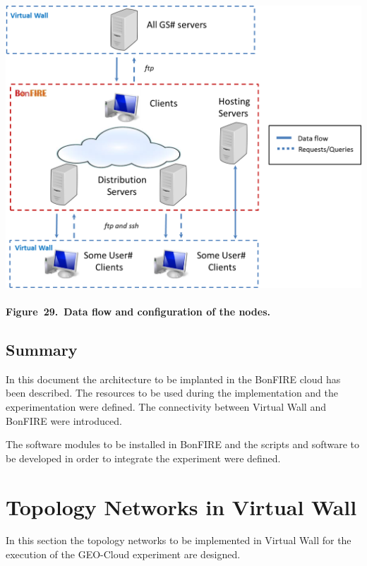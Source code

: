 \documentclass[a4paper]{article}
\begin{document}
{\centering 
\includegraphics[width=5.38496in,height=4.27496in]{out-img37.png} \par}

{\centering\bfseries
\label{bkm:Ref378755152}Figure\ 29.\ Data flow and configuration of the
nodes.
\par}


\bigskip

\subsection[Summary]{Summary}
\hypertarget{Toc381777228}{}
\bigskip

In this document the architecture to be implanted in the BonFIRE cloud
has been described. The resources to be used during the implementation
and the experimentation were defined. The connectivity between Virtual
Wall and BonFIRE were introduced.


\bigskip

The software modules to be installed in BonFIRE and the scripts and
software to be developed in order to integrate the experiment were
defined.

\section[Topology Networks in Virtual Wall]{Topology Networks in Virtual
Wall}
\label{bkm:Ref378931913}\hypertarget{Toc381777229}{}
\bigskip

In this section the topology networks to be implemented in Virtual Wall
for the execution of the GEO-Cloud experiment are designed.\ 
\end{document}
